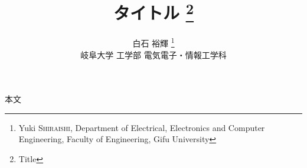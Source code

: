 \documentclass[a4paper, twocolumn]{jsarticle}
\title{
  タイトル
  \footnote{Title}
}
\author{
  白石 裕輝
  \setcounter{footnote}{1}
  \thanks{
    Yuki \textsc{Shiraishi},
    Department of Electrical, Electronics and Computer Engineering, Faculty of Engineering, Gifu University
  }
  \\
  {\small 岐阜大学 工学部 電気電子・情報工学科}
}
\date{}
\begin{document}
  \maketitle
  本文
\end{document}
